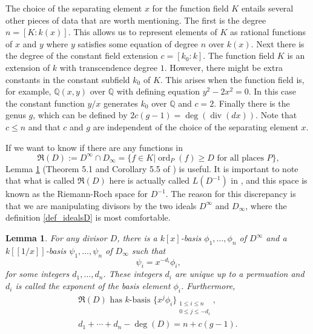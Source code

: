 \documentclass[12pt,reqno]{amsart}
\numberwithin{equation}{section}
\newtheorem{lemma}[theorem]{Lemma}
\newcommand{\op}[1]  { \operatorname{ #1 }}
\newcommand{\goR}[0]  { \mathfrak{R}}
\begin{document}
The choice of the separating element $x$ for the function field $K$ entails several other pieces of data that are worth mentioning. The first is the degree $n=[K:k(x)]$. This allows us to represent elements of $K$ as rational functions of $x$ and $y$ where $y$ satisfies some equation of degree $n$ over $k(x)$. Next there is the degree of the constant field extension $c=[k_0:k]$. The function field $K$ is an extension of $k$ with transcendence degree $1$. However, there might be extra constants in the constant subfield $k_0$ of $K$. This arises when the function field is, for example, $\mathbb{Q}(x,y)$ over $\mathbb{Q}$ with defining equation $y^2-2x^2=0$. In this case the constant function $y/x$ generates $k_0$ over $\mathbb{Q}$ and $c=2$. Finally there is the genus $g$, which can be defined by $2c(g-1) = \op{deg}(\op{div}(dx))$. Note that $c \le n$ and that $c$ and $g$ are independent of the choice of the separating element $x$.

If we want to know if there are any functions in
\begin{equation}
\goR(D):=D^{\infty} \cap D_{\infty}=\{ f \in K | \operatorname{ord}_P(f) \ge D \text{ for all places } P\}\text{,}
\end{equation}
Lemma \ref{lemma_normal_basis} (Theorem 5.1 and Corollary 5.5 of \cite{hess}) is useful. It is important to note that what is called $\goR(D)$ here is actually called $L(D^{-1})$ in \cite{hess}, and this space is known as the Riemann-Roch space for $D^{-1}$. The reason for this discrepancy is that we are manipulating divisors by the two ideals $D^{\infty}$ and $D_{\infty}$, where the definition \eqref{def_idealsD} is most comfortable.

\begin{lemma}
\label{lemma_normal_basis}
For any divisor $D$, there is a $k[x]$-basis $\phi_1,\dots,\phi_n$ of $D^{\infty}$ and a $k[[1/x]]$-basis $\psi_1,\dots,\psi_n$ of $D_{\infty}$ such that
\begin{equation*}
 \psi_i = x^{-d_i}\phi_i\text{,}
\end{equation*}
for some integers $d_1,\dots,d_n$. These integers $d_i$ are unique up to a permuation and $d_i$ is called the exponent of the basis element $\phi_i$. Furthermore,
\begin{gather*}
\goR (D) \text{ has $k$-basis } \{x^j \phi_i\}_{\substack{ 1 \le i \le n \\ 0 \le j \le -d_i}}\text{,}\\
d_1 + \cdots + d_n - \operatorname{deg}(D) = n + c (g-1)\text{.}
\end{gather*}
\end{lemma}
\end{document}
